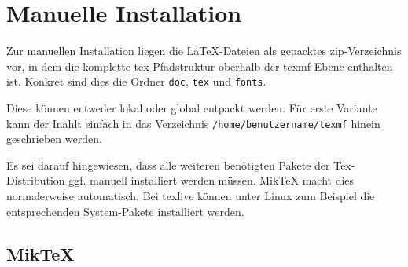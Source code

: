 \section{Manuelle Installation}

Zur manuellen Installation liegen die LaTeX-Dateien als gepacktes
zip-Verzeichnis vor, in dem die komplette tex-Pfadstruktur oberhalb der
texmf-Ebene enthalten ist. Konkret sind dies die Ordner
\lstinline{doc}, \lstinline{tex} und \lstinline{fonts}.

Diese können entweder lokal oder global entpackt werden.
Für erste Variante kann der Inahlt einfach in das Verzeichnis
\lstinline{/home/benutzername/texmf} hinein geschrieben werden.

Es sei darauf hingewiesen, dass alle weiteren benötigten Pakete der
Tex-Distribution ggf. manuell installiert werden müssen.
MikTeX macht dies normalerweise automatisch.
Bei texlive können unter Linux zum Beispiel die entsprechenden System-Pakete
installiert werden.


\subsection{MikTeX}

